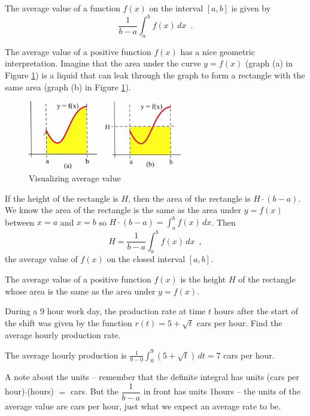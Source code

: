\begin{definition}
The average value of a function $f(x)$ on the interval $[a,b]$ is given by
$$\frac{1}{b-a}\int_a^b f(x)\,dx \enspace .$$
\end{definition}

The average value of a positive function $f(x)$ has a nice geometric interpretation. Imagine that the area under the curve $y=f(x)$ (graph (a) in Figure \ref{fig:5-8-liquid}) is a liquid that can leak through the graph to form a rectangle with the same area (graph (b) in Figure \ref{fig:5-8-liquid}).

\begin{figure}[!ht]
  \centering
    \includegraphics[width=0.6\textwidth]{img/chap5/image053.png}
    \caption{Visualizing average value}
    \label{fig:5-8-liquid}
\end{figure}

If the height of the rectangle is $H$, then the area of the rectangle is $H\cdot(b-a)$. We know the area of the rectangle is the same as the area under $y=f(x)$ between $x=a$ and $x=b$ so $H\cdot(b-a)=\int_a^b f(x)\,dx$. Then
$$H = \frac{1}{b-a}\int_a^bf(x)\,dx\enspace ,$$
the average value of $f(x)$ on the closed interval $[a,b]$.

The average value of a positive function $f(x)$ is the height $H$ of the rectangle whose area is the same as the area under $y=f(x)$.

\begin{example}
During a 9 hour work day, the production rate at time $t$ hours after the start of the shift was given by the function $r(t)=5+\sqrt{t}$ cars per hour. Find the average hourly production rate.

\begin{solution}
The average hourly production is $\displaystyle\frac{1}{9-0}\displaystyle\int_0^9\left(5+\sqrt{t}\right)\,dt=7$ cars per hour.
\end{solution}\end{example}

A note about the units -- remember that the definite integral has units (cars per hour)$\cdot$(hours) $=$ cars. But the $\dfrac{1}{b-a}$ in front has units 1hours -- the units of the average value are cars per hour, just what we expect an average rate to be.

